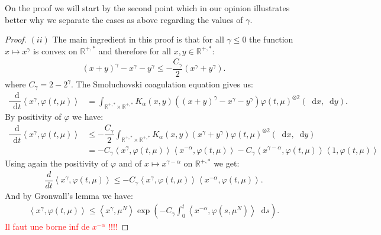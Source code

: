 \documentclass[11pt,a4paper]{article}
\newcommand{\RR}{\mathbb{R}}
\newcommand{\red}[1]{\textcolor{red}{#1}}
\newcommand{\dd}{\mathop{}\!\mathrm{d}}
\begin{document}
On the proof we will start by the second point which in our opinion illustrates better why we separate the cases as above regarding the values of $\gamma$.
\begin{proof}
    $(ii)$ The main ingredient in this proof is that for all $\gamma \leq 0$ the function $x \mapsto x^\gamma$ is convex on $\RR^{+,*}$ and therefore for all $x,y \in \RR^{+,*}$:
    \begin{align*}
        (x + y)^\gamma - x^\gamma - y^\gamma \leq -\dfrac{C_\gamma}{2}\left(x^\gamma + y^\gamma\right).
    \end{align*}
    where $C_\gamma = 2 - 2^{\gamma}$. The Smoluchovski coagulation equation gives us:
    \begin{align*}
        \dfrac{\dd}{\dd t} \left\langle x^\gamma, \varphi\left(t,\mu\right) \right\rangle &= \int_{\RR^{+,*}\times \RR^{+,*}} K_\alpha(x,y) \left((x + y)^\gamma - x^\gamma - y^\gamma \right) \varphi\left(t,\mu\right)^{\otimes 2}(\dd x, \dd y).
    \end{align*}
    By positivity of $\varphi$ we have:
    \begin{align*}
        \dfrac{\dd}{\dd t} \left\langle x^\gamma, \varphi\left(t,\mu\right) \right\rangle &\leq -\dfrac{C_\gamma}{2}\int_{\RR^{+,*}\times \RR^{+,*}} K_\alpha(x,y) \left(x^\gamma + y^\gamma \right) \varphi\left(t,\mu\right)^{\otimes 2}(\dd x, \dd y)\\
        &= -C_\gamma \left\langle x^\gamma, \varphi\left(t,\mu\right) \right\rangle\left\langle x^{-\alpha}, \varphi\left(t,\mu\right) \right\rangle
        - C_\gamma \left\langle x^{\gamma-\alpha}, \varphi\left(t,\mu\right) \right\rangle\left\langle 1, \varphi\left(t,\mu\right) \right\rangle
    \end{align*}
    Using again the positivity of $\varphi$ and of $x \mapsto x^{\gamma - \alpha}$ on $\RR^{+,*}$ we get:
    \begin{align*}
        \dfrac{d}{dt} \left\langle x^\gamma, \varphi\left(t,\mu\right) \right\rangle \leq -C_\gamma \left\langle x^\gamma, \varphi\left(t,\mu\right) \right\rangle\left\langle x^{-\alpha}, \varphi\left(t,\mu\right) \right\rangle.
    \end{align*}
    And by Gronwall's lemma we have:
    \begin{align*}
        \left\langle x^\gamma, \varphi\left(t,\mu\right) \right\rangle \leq \left\langle x^\gamma, \mu^N \right\rangle \exp\left({-C_\gamma \int_0^t \left\langle x^{-\alpha}, \varphi\left(s,\mu^N\right) \right\rangle \dd s}\right).
    \end{align*}
    \red{Il faut une borne inf de $x^{-\alpha}$ !!!!}
\end{proof}
\end{document}
